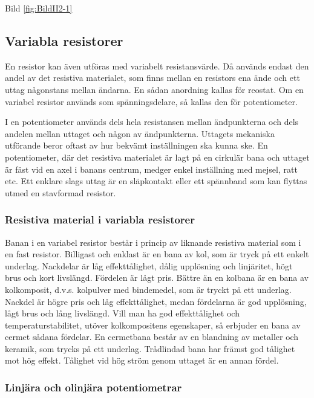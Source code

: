 Bild \ref{fig:BildII2-1}

\subsection{Variabla resistorer}

En resistor kan även utföras med variabelt resistansvärde. Då används endast
den andel av det resistiva materialet, som finns mellan en resistors ena ände
och ett uttag någonstans mellan ändarna. En sådan anordning kallas för reostat.
Om en variabel resistor används som spänningsdelare, så kallas den för
potentiometer.

I en potentiometer används dels hela resistansen mellan ändpunkterna och dels
andelen mellan uttaget och någon av ändpunkterna. Uttagets mekaniska utförande
beror oftast av hur bekvämt inställningen ska kunna ske. En potentiometer,
där det resistiva materialet är lagt på en cirkulär bana och uttaget är fäst
vid en axel i banans centrum, medger enkel inställning med mejsel, ratt etc.
Ett enklare slags uttag är en släpkontakt eller ett spännband som kan flyttas
utmed en stavformad resistor.

\subsubsection{Resistiva material i variabla resistorer}

Banan i en variabel resistor består i princip av liknande resistiva material
som i en fast resistor. Billigast och enklast är en bana av kol, som är tryck
på ett enkelt underlag. Nackdelar är låg effekttålighet, dålig upplösning och
linjäritet, högt brus och kort livslängd. Fördelen är lågt pris.
Bättre än en kolbana är en bana av kolkomposit, d.v.s. kolpulver med bindemedel,
som är tryckt på ett underlag. Nackdel är högre pris och låg effekttålighet,
medan fördelarna är god upplösning, lågt brus och lång livslängd.
Vill man ha god effekttålighet och temperaturstabilitet, utöver kolkompositens
egenskaper, så erbjuder en bana av cermet sådana fördelar. En cermetbana består
av en blandning av metaller och keramik, som trycks på ett underlag.
Trådlindad bana har främst god tålighet mot hög effekt. Tålighet vid hög ström
genom uttaget är en annan fördel.

\subsubsection{Linjära och olinjära potentiometrar}


